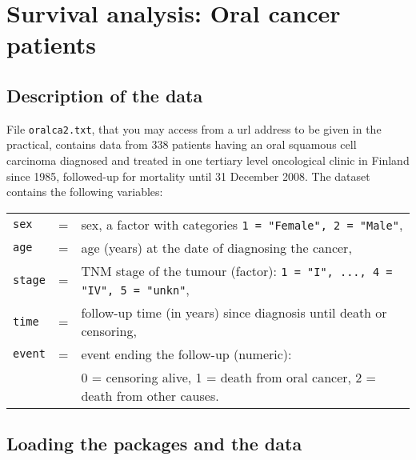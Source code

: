 

\section{Survival analysis: Oral cancer patients}


\subsection{Description of the data}


File \verb|oralca2.txt|, that you may
access from a url address to be given in the practical,
contains data from 338
patients having an oral squamous cell carcinoma diagnosed and treated
in one tertiary level oncological clinic in Finland since 1985, followed-up
for mortality until 31 December 2008.
The dataset contains the following variables:

\medskip
\begin{tabular}{lcl}
{\tt sex}         &=& sex, a factor with categories
    \verb|1 = "Female", 2 = "Male"|,    \\
{\tt age}         &=& age (years) at the date of diagnosing the cancer,  \\
{\tt stage}       &=& TNM stage of the tumour (factor): \verb|1 = "I", ..., 4 = "IV", 5 = "unkn"|, \\
{\tt time}       &=& follow-up time (in years) since diagnosis until death or censoring,\\
{\tt event}      &=& event ending the follow-up (numeric): \\
{ }         & & 0 = censoring alive, 1 = death from oral cancer, 2 = death from other causes. \\
\end{tabular}


\subsection{Loading the packages and the data}


